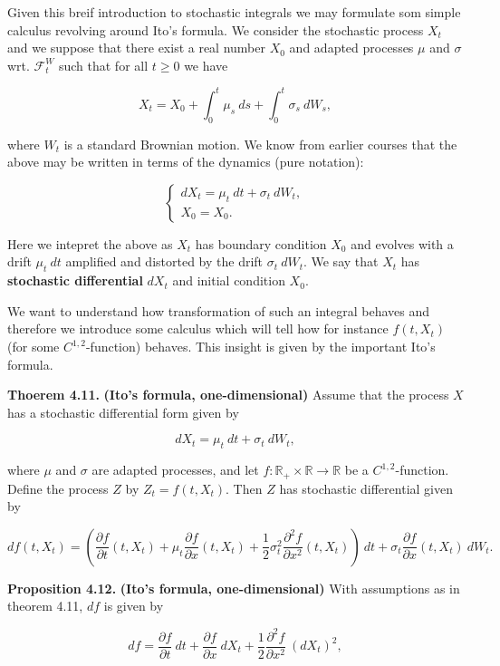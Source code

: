 \documentclass[
]{article}
\begin{document}
Given this breif introduction to stochastic integrals we may formulate
som simple calculus revolving around Ito's formula. We consider the
stochastic process \(X_t\) and we suppose that there exist a real number
\(X_0\) and adapted processes \(\mu\) and \(\sigma\) wrt.
\(\mathcal{F}_t^W\) such that for all \(t\ge0\) we have

\[
X_t=X_0+\int_0^t\mu_s\ ds+\int_0^t\sigma_s\ dW_s,\tag{4.16}
\]

where \(W_t\) is a standard Brownian motion. We know from earlier
courses that the above may be written in terms of the dynamics (pure
notation):

\[
\left\{\begin{matrix}dX_t=\mu_t\ dt+\sigma_t\ dW_t,\\ X_0=X_0.\end{matrix}\right.
\]

Here we intepret the above as \(X_t\) has boundary condition \(X_0\) and
evolves with a drift \(\mu_t\ dt\) amplified and distorted by the drift
\(\sigma_t\ dW_t\). We say that \(X_t\) has \textbf{stochastic
differential} \(dX_t\) and initial condition \(X_0\).

We want to understand how transformation of such an integral behaves and
therefore we introduce some calculus which will tell how for instance
\(f(t,X_t)\) (for some \(C^{1,2}\)-function) behaves. This insight is
given by the important Ito's formula.

\textbf{Thoerem 4.11.} \textbf{(Ito's formula, one-dimensional)} Assume
that the process \(X\) has a stochastic differential form given by

\[
dX_t=\mu_t\ dt + \sigma_t\ dW_t,\tag{4.28}
\]

where \(\mu\) and \(\sigma\) are adapted processes, and let
\(f:\mathbb{R}_+\times\mathbb{R}\to\mathbb{R}\) be a
\(C^{1,2}\)-function. Define the process \(Z\) by \(Z_t=f(t,X_t)\). Then
\(Z\) has stochastic differential given by

\[
df(t,X_t)=\left(\frac{\partial f}{\partial t}(t,X_t) + \mu_t\frac{\partial f}{\partial x}(t,X_t) + \frac{1}{2}\sigma^2_t\frac{\partial^2 f}{\partial x^2}(t,X_t)\right)\ dt+\sigma_t\frac{\partial f}{\partial x}(t,X_t)\ dW_t.\tag{4.29}
\]

\textbf{Proposition 4.12.} \textbf{(Ito's formula, one-dimensional)}
With assumptions as in theorem 4.11, \(df\) is given by

\[
df=\frac{\partial f}{\partial t}\ dt + \frac{\partial f}{\partial x}\ dX_t + \frac{1}{2}\frac{\partial^2 f}{\partial x^2}\ (dX_t)^2,\tag{4.31}
\]
\end{document}
